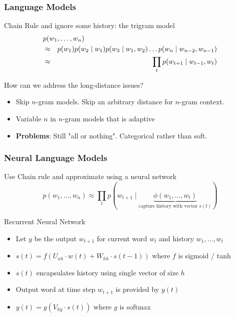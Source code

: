 \begin{frame}
\frametitle{Language Models}
\begin{block}{Chain Rule and ignore some history: the trigram model}
\begin{eqnarray*}
\lefteqn{p(w_1, \ldots, w_n) } \\
&\approx& p(w_1) p(w_2 \mid w_1) p(w_3 \mid w_1, w_2) \ldots p(w_n \mid w_{n-2}, w_{n-1}) \\
&\approx& \prod_{t} p(w_{t+1} \mid w_{t-1}, w_t)
\end{eqnarray*}
\end{block}
\pause
\begin{block}{How can we address the long-distance issues?}
\begin{itemize}
\item Skip $n$-gram models. Skip an arbitrary distance for $n$-gram context.
\item Variable $n$ in $n$-gram models that is adaptive
\item {\bf Problems}: Still "all or nothing". Categorical rather than soft.
\end{itemize}
\end{block}
\end{frame}


\begin{frame}
\frametitle{Neural Language Models}
\begin{block}{Use Chain rule and approximate using a neural network}
\[ p(w_1, \ldots, w_n) \approx \prod_{t} p(w_{t+1} \mid \underbrace{\phi(w_1, \ldots, w_t)}_{\text{capture history with vector $s(t)$}}) \]
\end{block}
\pause
\begin{block}{Recurrent Neural Network}
\begin{itemize}[<+->]
	\item Let $y$ be the output $w_{t+1}$ for current word $w_t$ and history $w_1, \ldots, w_t$
	\item $s(t) = f(U_{xh} \cdot w(t) + W_{hh} \cdot s(t-1))$ where $f$ is sigmoid / tanh
	\item $s(t)$ encapsulates history using single vector of size $h$
	\item Output word at time step $w_{t+1}$ is provided by $y(t)$
	\item $y(t) = g(V_{hy} \cdot s(t))$ where $g$ is softmax
\end{itemize}
\end{block}
\end{frame}

